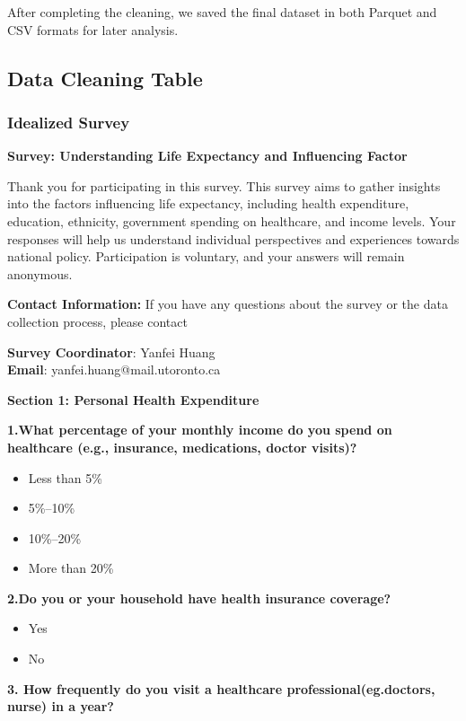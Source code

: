 \documentclass[
  letterpaper,
  DIV=11,
  numbers=noendperiod]{scrartcl}
\providecommand{\tightlist}{%
  \setlength{\itemsep}{0pt}\setlength{\parskip}{0pt}}\usepackage{longtable,booktabs,array}
\begin{document}
After completing the cleaning, we saved the final dataset in both
Parquet and CSV formats for later analysis.

\subsection{Data Cleaning Table}\label{data-cleaning-table}

\subsubsection{Idealized Survey}\label{idealized-survey}

\textbf{Survey: Understanding Life Expectancy and Influencing Factor}

Thank you for participating in this survey. This survey aims to gather
insights into the factors influencing life expectancy, including health
expenditure, education, ethnicity, government spending on healthcare,
and income levels. Your responses will help us understand individual
perspectives and experiences towards national policy. Participation is
voluntary, and your answers will remain anonymous.

\textbf{Contact Information:} If you have any questions about the survey
or the data collection process, please contact

\textbf{Survey Coordinator}: Yanfei Huang\\
\textbf{Email}: yanfei.huang@mail.utoronto.ca

\textbf{Section 1: Personal Health Expenditure}

\textbf{1.What percentage of your monthly income do you spend on
healthcare (e.g., insurance, medications, doctor visits)?}

\begin{itemize}
\tightlist
\item
  Less than 5\%
\item
  5\%--10\%
\item
  10\%--20\%
\item
  More than 20\%
\end{itemize}

\textbf{2.Do you or your household have health insurance coverage?}

\begin{itemize}
\tightlist
\item
  Yes
\item
  No
\end{itemize}

\textbf{3. How frequently do you visit a healthcare
professional(eg.doctors, nurse) in a year?}
\end{document}
